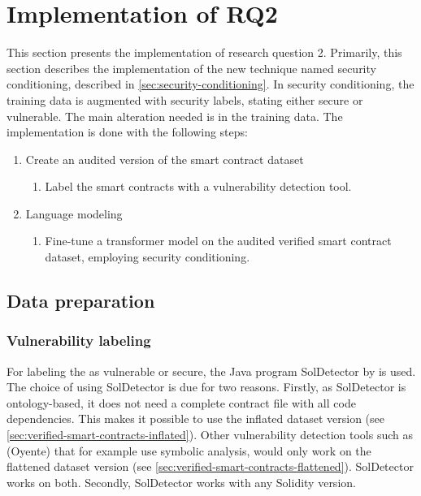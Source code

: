 \FloatBarrier

\section{Implementation of RQ2}
This section presents the implementation of research question 2. Primarily, this section describes the implementation of the new technique named security conditioning, described in \cref{sec:security-conditioning}. In security conditioning, the training data is augmented with security labels, stating either secure or vulnerable. The main alteration needed is in the training data. The implementation is done with the following steps:
\begin{enumerate}
    \item Create an audited version of the smart contract dataset
    \begin{enumerate}
        \item Label the smart contracts with a vulnerability detection tool.
    \end{enumerate}
    \item Language modeling
    \begin{enumerate}
        \item Fine-tune a transformer model on the audited verified smart contract dataset, employing security conditioning.
    \end{enumerate}
\end{enumerate}

\subsection{Data preparation}
\label{sec:data-preparation}

\subsubsection{Vulnerability labeling}
\label{sec:vulnerability-labeling}
For labeling the  as vulnerable or secure, the Java program SolDetector by \textcite{soldetector} is used. The choice of using SolDetector is due for two reasons. Firstly, as SolDetector is ontology-based, it does not need a complete contract file with all code dependencies. This makes it possible to use the inflated dataset version (see \cref{sec:verified-smart-contracts-inflated}). Other vulnerability detection tools such as \textsc(Oyente) \cite{oyente2016making} that for example use symbolic analysis, would only work on the flattened dataset version (see \cref{sec:verified-smart-contracts-flattened}). SolDetector works on both. Secondly, SolDetector works with any Solidity version.

